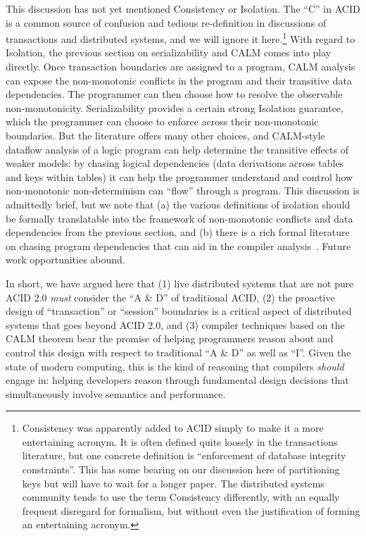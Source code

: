 \documentclass{sig-alternate}
\begin{document}
This discussion has not yet mentioned Consistency or Isolation.  The ``C'' in ACID is a common source of confusion and tedious re-definition in discussions of transactions and distributed systems, and we will ignore it here.\footnote{Consistency was apparently added to ACID simply to make it a more entertaining acronym.  It is often defined quite loosely in the transactions literature, but one concrete definition is ``enforcement of database integrity constraints''.  This has some bearing on our discussion here of partitioning keys but will have to wait for a longer paper.  The distributed systems community tends to use the term Consistency differently, with an equally frequent disregard for formalism, but without even the justification of forming an entertaining acronym.}  With regard to Isolation, the previous section on serializability and CALM comes into play directly.  Once transaction boundaries are assigned to a program, CALM analysis can expose the non-monotonic conflicts in the program and their transitive data dependencies.  The programmer can then choose how to resolve the observable non-monotonicity.  Serializability provides a certain strong Isolation guarantee, which the programmer can choose to enforce across their non-monotonic boundaries.  But the literature offers many other choices, and CALM-style dataflow analysis of a logic program can help determine the transitive effects of weaker models: by chasing logical dependencies (data derivations across tables and keys within tables) it can help the programmer understand and control how non-monotonic non-determinism can ``flow'' through a program.  This discussion is admittedly brief, but we note that (a) the various definitions of isolation should be formally translatable into the framework of non-monotonic conflicts and data dependencies from the previous section, and (b) there is a rich formal literature on chasing program dependencies that can aid in the compiler analysis~\cite{alicebook}.  Future work opportunities abound.

In short, we have argued here that (1) live distributed systems that are not pure ACID 2.0 \emph{must} consider the ``A \& D'' of traditional ACID, (2) the proactive design of ``transaction'' or ``session'' boundaries is a critical aspect of distributed systems that goes beyond ACID 2.0, and (3) compiler techniques based on the CALM theorem bear the promise of helping programmers reason about and control this design with respect to traditional ``A \& D'' as well as ``I''.  Given the state of modern computing, this is the kind of reasoning that compilers \emph{should} engage in: helping developers reason through fundamental design decisions that simultaneously involve semantics and performance.  
\end{document}
